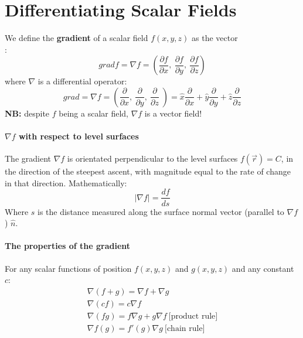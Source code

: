 \documentclass[11pt]{article}
\begin{document}
    \section{Differentiating Scalar Fields}\label{sec:differentiating-scalar-fields}
    We define the \textbf{gradient} of a scalar field $f(x,y,z)$ as the vector\\:
    \begin{equation}
        \label{eq:equation}
        grad f = \nabla f = (\frac{ \partial f}{\partial x},\: \frac{ \partial f}{\partial y},\: \frac{ \partial f}{\partial z})
    \end{equation}
    where $\nabla$ is a differential operator:
    \begin{equation}
        grad  = \nabla f = (\frac{ \partial }{\partial x},\: \frac{ \partial }{\partial y},\: \frac{ \partial }{\partial z}\;)
        = \hat{x} \frac{\partial}{\partial x} + \hat{y} \frac{\partial}{\partial y} + \hat{z} \frac{\partial}{\partial z}
        \label{eq:equation2}
    \end{equation}
    \textbf{NB:} despite $f$ being a scalar field, $\nabla f$ is a vector field!
    \\
    \paragraph{$\nabla f$ with respect to level surfaces}
    The gradient $\nabla f$ is orientated perpendicular to the level surfaces $f(\vec{r}) = C$, in the direction of the steepest ascent,
    with magnitude equal to the rate of change in that direction.
    Mathematically:
    \begin{equation}
        \label{eq:equation3}
        | \nabla f | = \frac{df}{ds}
    \end{equation}
    Where $s$ is the distance measured along the surface normal vector (parallel to $\nabla f$) $\hat{n}$.

    \paragraph{The properties of the gradient} For any scalar functions of position $f(x,y,z)$ and $g(x,y,z)$ and any constant
    $c$:
    \begin{subequations}
        \begin{align}
            \nabla (f + g) = \nabla f + \nabla g\\
            \nabla (cf) = c \nabla f\\
            \nabla (fg) = f \nabla g + g \nabla f \: \text{[product rule]}\\
            \nabla f(g) = f'(g) \nabla g  \: \text{[chain rule]}\\
        \end{align}
    \end{subequations}
\end{document}
